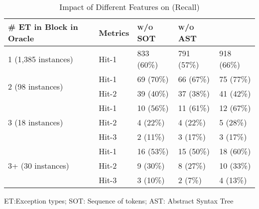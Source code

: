 
\begin{table}[t]
  \caption{Impact of Different Features on {\xtype} (Recall)}
  \vspace{-12pt}
	\tabcolsep 2pt
	{\small
		\begin{center}
			\renewcommand{\arraystretch}{1}
			\begin{tabular}{p{2cm}<{\centering}|p{1cm}<{\centering}|p{1.5cm}<{\centering}|p{1.5cm}<{\centering}|p{1.5cm}<{\centering}}
				\hline
				\# ET in \code{Try-Catch} Block in Oracle & Metrics &{\textsc{\tool w/o SOT}\xspace}&{\textsc{\tool w/o AST}\xspace}& {\textsc{\tool}\xspace} \\
				\hline
				\multirow{1}{*}{1 (1,385 instances)} & Hit-1  &833 (60\%)& 791 (57\%)& 918 (66\%) \\
				\hline
				\multirow{2}{*}{2 (98 instances)}    & Hit-1  &69 (70\%)& 66 (67\%)& 75 (77\%) \\
				                                     & Hit-2  &39 (40\%)& 37 (38\%)&  41 (42\%) \\
				\hline
				\multirow{3}{*}{3 (18 instances)}    & Hit-1  &10 (56\%)&11 (61\%)& 12 (67\%) \\
				                                     & Hit-2  &4 (22\%)& 4 (22\%)& 5 (28\%)\\
				                                     & Hit-3  &2 (11\%)& 3 (17\%)& 3 (17\%) \\
				\hline
				\multirow{4}{*}{3+ (30 instances)}   & Hit-1  &16 (53\%)&15 (50\%)& 18 (60\%) \\
				                                     & Hit-2  &9 (30\%)& 8 (27\%)& 10 (33\%) \\
				                                     & Hit-3  &3 (10\%)& 2 (7\%)& 4 (13\%)\\
				\hline
			\end{tabular}
		ET:Exception types; SOT: Sequence of tokens; AST: Abstract Syntax Tree		
			\label{tab:sensi-xtype-recall}
		\end{center}
	}
\end{table}

